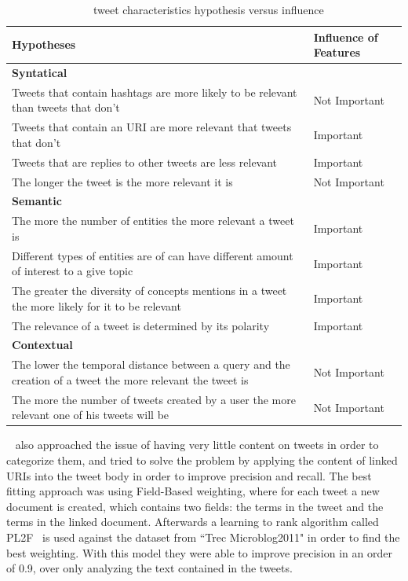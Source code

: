 \begin{table}[tb]
  \caption{~\citet{Tao2012} tweet characteristics hypothesis versus influence}
  \label{tab:tao_table}
  \begin{tabularx}{\textwidth}{|X|l|}
  \hline
  \textbf{Hypotheses} & \textbf{Influence of Features} \\
  \hline
  \hline

  {\bf Syntatical} &  \\
  \hline
  Tweets that contain hashtags are more likely to be relevant than tweets that don't & Not Important \\
  \hline
  Tweets that contain an URI are more relevant that tweets that don't  &Important \\
  \hline
  Tweets that are replies to other tweets are less relevant & Important \\
  \hline
  The longer the tweet is the more relevant it is & Not Important\\
  \hline
  \hline

  {\bf Semantic}  &  \\
  \hline
  
  The more the number of entities the more relevant a tweet is  & Important \\
  \hline
  Different types of entities are of can have different amount of interest to a give topic  & Important \\
  \hline
  The greater the diversity of concepts mentions in a tweet the more likely for it to be relevant & Important \\
  \hline
  The relevance of a tweet is determined by its polarity & Important \\
  \hline
  \hline

  {\bf Contextual} &  \\
  \hline
  The lower the temporal distance between a query and the creation of a tweet the more relevant the tweet is  & Not Important \\
  \hline
  The more the number of tweets created by a user the more relevant one of his tweets will be & Not Important \\
  \hline
  \end{tabularx}
\end{table}

~\citet{McCreadie2013} also approached the issue of having very little content on tweets in order to categorize them, and tried to solve the problem by applying the content of linked URIs into the tweet body in order to improve precision and recall. The best fitting approach was using Field-Based weighting, where for each tweet a new document is created, which contains two fields: the terms in the tweet and the terms in the linked document. 
Afterwards a learning to rank algorithm called PL2F~\cite{macdonald2008} is used against the dataset from ``Trec Microblog2011" in order to find the best weighting. 
With this model they were able to improve precision in an order of 0.9, over only analyzing the text contained in the tweets. 

